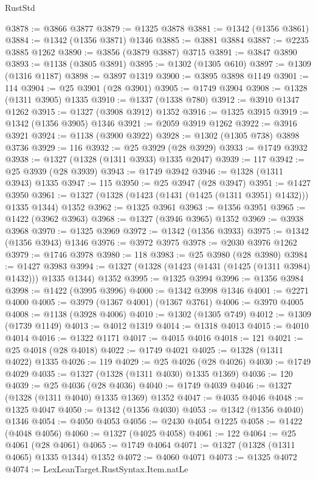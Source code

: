 \begin{lexlean}{RustStd}
\begin{coremodule}
@3878 := @3866 @3877
@3879 := @1325 @3878
@3881 := @1342 (@1356 @3861)
@3884 := @1342 (@1356 @3871) @1346
@3885 := @3881 @3884
@3887 := @2235 @3885 @1262
@3890 := @3856 (@3879 @3887) @3715
@3891 := @3847 @3890
@3893 := @1138 (@3805 @3891)
@3895 := @1302 (@1305 @610)
@3897 := @1309 (@1316 @1187)
@3898 := @3897 @1319
@3900 := @3895 @3898 @1149
@3901 := 114
@3904 := @25 @3901 (@28 @3901)
@3905 := @1749 @3904
@3908 := @1328 (@1311 @3905) @1335
@3910 := @1337 (@1338 @780)
@3912 := @3910 @1347 @1262
@3915 := @1327 (@3908 @3912) @1352
@3916 := @1325 @3915
@3919 := @1342 (@1356 @3905) @1346
@3921 := @2059 @3919 @1262
@3922 := @3916 @3921
@3924 := @1138 (@3900 @3922)
@3928 := @1302 (@1305 @738) @3898 @3736
@3929 := 116
@3932 := @25 @3929 (@28 @3929)
@3933 := @1749 @3932
@3938 := @1327 (@1328 (@1311 @3933) @1335 @2047)
@3939 := 117
@3942 := @25 @3939 (@28 @3939)
@3943 := @1749 @3942
@3946 := @1328 (@1311 @3943) @1335
@3947 := 115
@3950 := @25 @3947 (@28 @3947)
@3951 := @1427 @3950
@3961 := @1327 (@1328 (@1423 (@1431 (@1425 (@1311 @3951) @1432))) @1335 @1344) @1352
@3962 := @1325 @3961
@3963 := @1356 @3951
@3965 := @1422 (@3962 @3963)
@3968 := @1327 (@3946 @3965) @1352
@3969 := @3938 @3968
@3970 := @1325 @3969
@3972 := @1342 (@1356 @3933)
@3975 := @1342 (@1356 @3943) @1346
@3976 := @3972 @3975
@3978 := @2030 @3976 @1262
@3979 := @1746 @3978
@3980 := 118
@3983 := @25 @3980 (@28 @3980)
@3984 := @1427 @3983
@3994 := @1327 (@1328 (@1423 (@1431 (@1425 (@1311 @3984) @1432))) @1335 @1344) @1352
@3995 := @1325 @3994
@3996 := @1356 @3984
@3998 := @1422 (@3995 @3996)
@4000 := @1342 @3998 @1346
@4001 := @2271 @4000
@4005 := @3979 (@1367 @4001) (@1367 @3761)
@4006 := @3970 @4005
@4008 := @1138 (@3928 @4006)
@4010 := @1302 (@1305 @749)
@4012 := @1309 (@1739 @1149)
@4013 := @4012 @1319
@4014 := @1318 @4013
@4015 := @4010 @4014
@4016 := @1322 @1171
@4017 := @4015 @4016
@4018 := 121
@4021 := @25 @4018 (@28 @4018)
@4022 := @1749 @4021
@4025 := @1328 (@1311 @4022) @1335
@4026 := 119
@4029 := @25 @4026 (@28 @4026)
@4030 := @1749 @4029
@4035 := @1327 (@1328 (@1311 @4030) @1335 @1369)
@4036 := 120
@4039 := @25 @4036 (@28 @4036)
@4040 := @1749 @4039
@4046 := @1327 (@1328 (@1311 @4040) @1335 @1369) @1352
@4047 := @4035 @4046
@4048 := @1325 @4047
@4050 := @1342 (@1356 @4030)
@4053 := @1342 (@1356 @4040) @1346
@4054 := @4050 @4053
@4056 := @2430 @4054 @1225
@4058 := @1422 (@4048 @4056)
@4060 := @1327 (@4025 @4058)
@4061 := 122
@4064 := @25 @4061 (@28 @4061)
@4065 := @1749 @4064
@4071 := @1327 (@1328 (@1311 @4065) @1335 @1344) @1352
@4072 := @4060 @4071
@4073 := @1325 @4072
@4074 := LexLeanTarget.RustSyntax.Item.natLe

\end{coremodule}
\end{lexlean}
